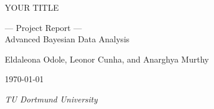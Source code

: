 \documentclass[12pt]{article}
\begin{document}
\begin{titlepage}
        \centering %
        \vspace*{\baselineskip} %
        
        {\huge YOUR TITLE}\\[0.2\baselineskip] %
        
        
        \vspace*{\baselineskip}
        
        {\Large --- Project Report ---\\
          Advanced Bayesian Data Analysis\\[\baselineskip]} %
        \vspace*{\baselineskip}
        
        {\LARGE Eldaleona Odole,  Leonor Cunha, and Anarghya Murthy\\[\baselineskip]} %
        
        \vspace*{\baselineskip}

        \vfill
        
        \today \par %
        
        \vspace*{\baselineskip}

        {\itshape TU Dortmund University\par} %
    \end{titlepage}

\clearpage



\end{document}
